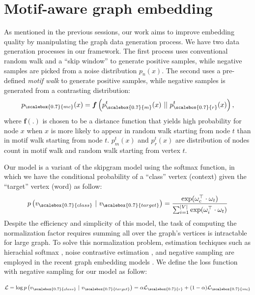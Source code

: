 \documentclass{sig-alternate-05-2015}
\begin{document}
\section{Motif-aware graph embedding}

As mentioned in the previous sessions, our work aims
to improve embedding quality by manipulating the graph
data generation process. We have two data generation processes in 
our framework. The first process uses conventional 
random walk and a ``skip window'' to generate positive
samples, while negative samples are picked from a noise
distribution $p_n(x)$. The second uses a pre-defined 
\emph{motif walk} to generate positive samples, while
negative samples is generated from a contrasting distribution:
\begin{equation} \label{eq:dist}
  p_{\scalebox{0.7}{mc}}(x) = 
    \boldsymbol f\left(p^t_{\scalebox{0.7}{m}}(x) \ || \ p^t_{\scalebox{0.7}{r}}(x)\right),
\end{equation}
where $\boldsymbol f(.)$ is chosen to be a distance function that
yields high probability for node $x$ when $x$ is more
likely to appear in random walk starting from node $t$
than in motif walk starting from node $t$. $p^t_m(x)$ and
$p^t_r(x)$ are distribution of nodes count in motif walk
and random walk starting from vertex $t$. 

Our model is a variant of the skipgram model \cite{w2v}
using the softmax function, in which we have the  
conditional probability of a ``class'' vertex (context) given 
the ``target'' vertex (word) as follow:
\begin{equation} \label{eq:softmax}
  p\left(v_{\scalebox{0.7}{class}} \ | \ v_{\scalebox{0.7}{target}}\right) 
    = \frac{\exp(\omega^\top_c \cdot \omega_t)}{\sum^{|V|}_{i=1} \exp(\omega^\top_i \cdot \omega_t)}
\end{equation}
Despite the efficiency and simplicity of this model,
the task of computing the normalization factor requires
summing all over the graph's vertices is intractable
for large graph. To solve this normalization problem,
estimation techiques such as hierachial softmax \cite{hsoftmax}, 
noise contrastive estimation \cite{nce}, and negative
sampling \cite{w2v} are employed in the recent graph
embedding models \cite{deepwalk, line, platenoid}.
We define the loss function with negative sampling
for our model as follow:

\begin{equation} \label{eq:loss}
  \begin{aligned}
    \mathcal{L} & = \log p\left(v_{\scalebox{0.7}{class}} \ | \ v_{\scalebox{0.7}{target}}\right)
                  = \alpha \mathcal{L}_{\scalebox{0.7}{r}} + (1-\alpha) \mathcal{L}_{\scalebox{0.7}{mc}} \\
  \end{aligned}
\end{equation}
\end{document}
